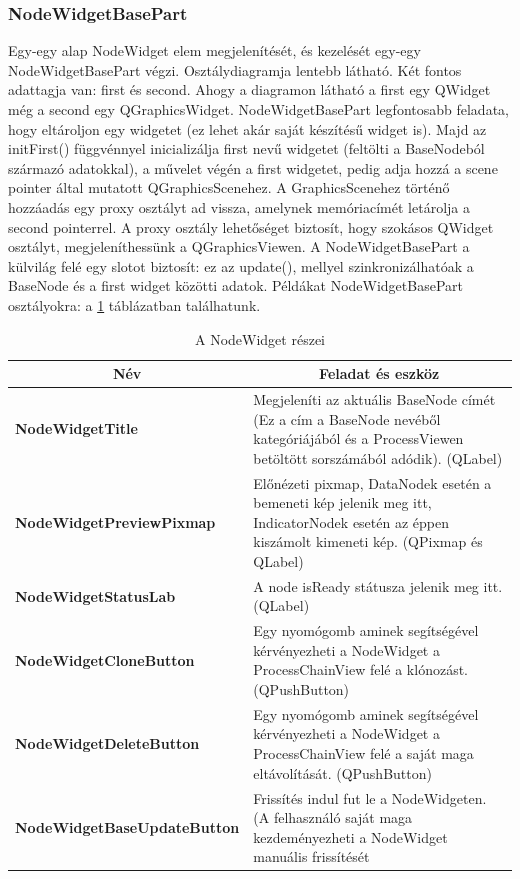 \documentclass[a4paper,12pt,oneside]{report}
\begin{document}
\subsubsection{NodeWidgetBasePart}
Egy-egy alap NodeWidget elem megjelenítését, és kezelését egy-egy NodeWidgetBasePart végzi. Osztálydiagramja lentebb látható. Két fontos adattagja van: first és second. Ahogy a diagramon látható a first egy QWidget még a second egy QGraphicsWidget. NodeWidgetBasePart legfontosabb feladata, hogy eltároljon egy widgetet (ez lehet akár saját készítésű widget is). Majd az initFirst() függvénnyel inicializálja first nevű widgetet (feltölti a BaseNodeból származó adatokkal), a művelet végén a first widgetet, pedig adja hozzá a scene pointer által mutatott QGraphicsScenehez. A GraphicsScenehez történő hozzáadás egy proxy osztályt ad vissza, amelynek memóriacímét letárolja a second pointerrel. A proxy osztály lehetőséget biztosít, hogy szokásos QWidget osztályt, megjeleníthessünk a QGraphicsViewen. 
A NodeWidgetBasePart a külvilág felé egy slotot biztosít: ez az update(), mellyel szinkronizálhatóak a BaseNode és a first widget közötti adatok. 
Példákat NodeWidgetBasePart osztályokra: a \ref{table:nodewidgetparts} táblázatban találhatunk.
\begin{table}[h]
\begin{tabular}{p{5.5cm}|p{7.5cm}}

\toprule
\multicolumn{1}{c}{\textbf{Név}} & \multicolumn{1}{c}{\textbf{Feladat és eszköz}} \\ \midrule
\textbf{NodeWidgetTitle} & Megjeleníti az aktuális BaseNode címét (Ez a cím a BaseNode nevéből kategóriájából és a ProcessViewen betöltött sorszámából adódik). (QLabel)\\
\hline
\textbf{NodeWidgetPreviewPixmap} & Előnézeti pixmap, DataNodek esetén a bemeneti kép jelenik meg itt, IndicatorNodek esetén az éppen kiszámolt kimeneti kép. (QPixmap és QLabel) \\
\hline
\textbf{NodeWidgetStatusLab} & A node isReady státusza jelenik meg itt. (QLabel) \\
\hline
\textbf{NodeWidgetCloneButton} & Egy nyomógomb aminek segítségével kérvényezheti a NodeWidget a ProcessChainView felé a klónozást. (QPushButton) \\
\hline
\textbf{NodeWidgetDeleteButton} & Egy nyomógomb aminek segítségével kérvényezheti a NodeWidget a ProcessChainView felé a saját maga eltávolítását. (QPushButton) \\
\hline
\textbf{NodeWidgetBaseUpdateButton} & Frissítés indul fut le a NodeWidgeten. (A felhasználó saját maga kezdeményezheti a NodeWidget manuális frissítését \\ 
\hline

\end{tabular}
\caption{A NodeWidget részei}
\label{table:nodewidgetparts}
\end{table}
\end{document}
